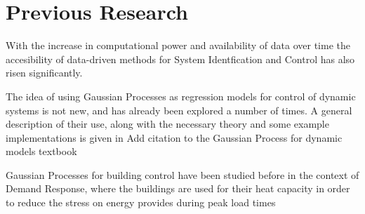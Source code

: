 \section{Previous Research}
With the increase in computational power and availability of data  over time the
accesibility of data-driven methods for System Identfication and Control has
also risen significantly. 

The idea of using Gaussian Processes as regression models for control of dynamic
systems is not new, and has already been explored a number of times. A general
description of their use, along with the necessary theory and some example
implementations is given in {\color{red} Add citation to the Gaussian Process
for dynamic models textbook}

Gaussian Processes for building control have been studied before in the context
of Demand Response, {\color{orange} where the buildings are used for their heat
capacity in order to reduce the stress on energy provides during peak load times}



\clearpage

